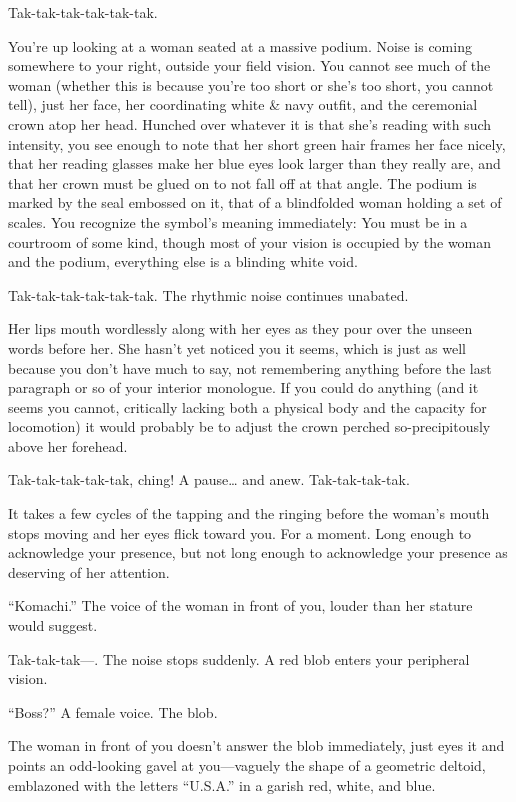 \documentclass[a4paper,12pt]{book}
\begin{document}
Tak-tak-tak-tak-tak-tak.

You’re up looking at a woman seated at a massive podium. Noise is coming somewhere to your right, outside your field vision. You cannot see much of the woman (whether this is because you’re too short or she’s too short, you cannot tell), just her face, her coordinating white & navy outfit, and the ceremonial crown atop her head. Hunched over whatever it is that she’s reading with such intensity, you see enough to note that her short green hair frames her face nicely, that her reading glasses make her blue eyes look larger than they really are, and that her crown must be glued on to not fall off at that angle. The podium is marked by the seal embossed on it, that of a blindfolded woman holding a set of scales. You recognize the symbol’s meaning immediately: You must be in a courtroom of some kind, though most of your vision is occupied by the woman and the podium, everything else is a blinding white void.

Tak-tak-tak-tak-tak-tak. The rhythmic noise continues unabated.

Her lips mouth wordlessly along with her eyes as they pour over the unseen words before her. She hasn’t yet noticed you it seems, which is just as well because you don’t have much to say, not remembering anything before the last paragraph or so of your interior monologue. If you could do anything (and it seems you cannot, critically lacking both a physical body and the capacity for locomotion) it would probably be to adjust the crown perched so-precipitously above her forehead.

Tak-tak-tak-tak-tak, ching! A pause… and anew. Tak-tak-tak-tak.

It takes a few cycles of the tapping and the ringing before the woman’s mouth stops moving and her eyes flick toward you. For a moment. Long enough to acknowledge your presence, but not long enough to acknowledge your presence as deserving of her attention.

``Komachi.'' The voice of the woman in front of you, louder than her stature would suggest.

Tak-tak-tak—. The noise stops suddenly. A red blob enters your peripheral vision.

``Boss?'' A female voice. The blob.

The woman in front of you doesn’t answer the blob immediately, just eyes it and points an odd-looking gavel at you—vaguely the shape of a geometric deltoid, emblazoned with the letters ``U.S.A.'' in a garish red, white, and blue.
\end{document}
